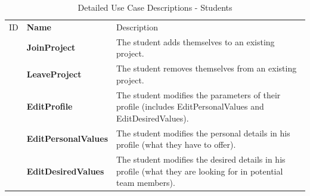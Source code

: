 \documentclass[12pt,letterpaper]{article}
\begin{document}
\begin{table}[H]
	\caption{Detailed Use Case Descriptions - Students}
	\vspace{1em}
	\begin{tabu} to 
	    \tableheader{}ID & Name & Description\\
		\joinproject{} & JoinProject & The student adds themselves to an existing project.\\
		\leaveproject{} & LeaveProject & The student removes themselves from an existing project.\\
		\editprofile{} & EditProfile & The student modifies the parameters of their profile (includes EditPersonalValues and EditDesiredValues).\\
		\editpersonalvalues{} & EditPersonalValues & The student modifies the personal details in his profile (what they have to offer). \\
		\editdesiredvalues{} & EditDesiredValues & The student modifies the desired details in his profile (what they are looking for in potential team members). \\
	\end{tabu}
\end{table}
\end{document}
